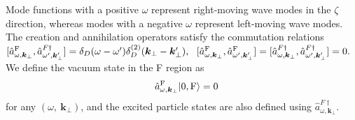 \documentclass[aps,prd,preprintnumbers,nofootinbib,showpacs,11pt]{revtex4}%
\begin{document}
\begin{widetext}
Mode functions with a positive $\omega$  
represent right-moving wave modes in the $\zeta$ direction,
whereas modes with a negative
$\omega$ represent left-moving wave modes. 
The creation and annihilation operators satisfy the commutation relations
$[{\hat a}^{\rm F}_{\omega,\bm k_\perp}, {\hat a}_{\omega',\bm k_\perp'}^{F\dagger}]
=\delta_D(\omega-\omega') \delta_D^{(2)}(\bm k_\perp-\bm k_\perp'), 
~~
[{\hat a}^{\rm F}_{\omega,\bm k_\perp}, {\hat a}_{\omega',\bm k_\perp'}^{\rm F}]
=[{\hat a}^{F\dagger}_{\omega,\bm k_\perp}, {\hat a}_{\omega',\bm k_\perp'}^{F\dagger}]
=0.
$
We define the vacuum state in the F region as 
\begin{eqnarray}
&&
\hat a_{\omega,\bm k_\perp}^\F|0,{\rm F}\rangle=0 
\label{fourdFvauum}
\end{eqnarray}
for any $(\omega,~\bm k_\perp)$, and the excited particle states are also defined using 
$\hat a_{\omega,\bm k_\perp}^{F\dagger}$. 


\end{widetext}
\end{document}
